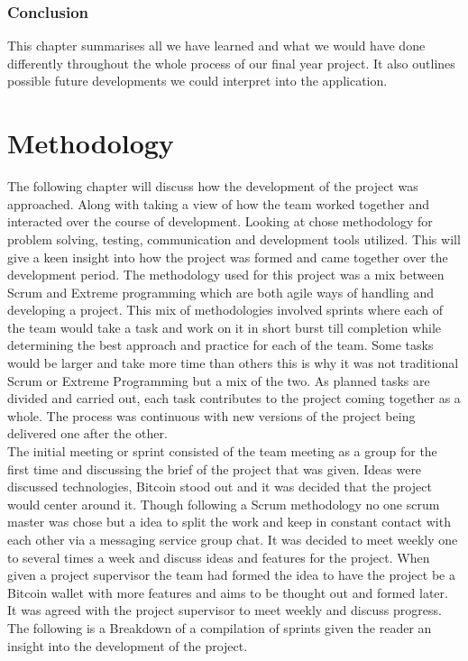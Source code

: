 \subsection{Conclusion}
This chapter summarises all we have learned and what we would have done differently throughout the whole process of our final year project. It also outlines possible future developments we could interpret into the application.



\chapter{Methodology}
The following chapter will discuss how the development of the project was approached. Along with taking a view of how the team worked together and interacted over the course of development. Looking at chose methodology for problem solving, testing, communication and development tools utilized. This will give a keen insight into how the project was formed and came together over the development period.
The methodology used for this project was a mix between Scrum and Extreme programming which are both agile ways of handling and developing a project. This mix of methodologies involved sprints where each of the team would take a task and work on it in short burst till completion while determining the best approach and practice for each of the team. Some tasks would be larger and take more time than others this is why it was not traditional Scrum or Extreme Programming but a mix of the two. As planned tasks are divided and carried out, each task contributes to the project coming together as a whole. The process was continuous with new versions of the project being delivered one after the other.\\
The initial meeting or sprint consisted of the team meeting as a group for the first time and discussing the brief of the project that was given. Ideas were discussed technologies, Bitcoin stood out and it was decided that the project would center around it. Though following a Scrum methodology no one scrum master was chose but a idea to split the work and keep in constant contact with each other via a messaging service group chat. It was decided to meet weekly one to several times a week and discuss ideas and features for the project. When given a project supervisor the team had formed the idea to have the project be a Bitcoin wallet with more features and aims to be thought out and formed later. It was agreed with the project supervisor to meet weekly and discuss progress. The following is a Breakdown of a compilation of sprints given the reader an insight into the development of the project.


